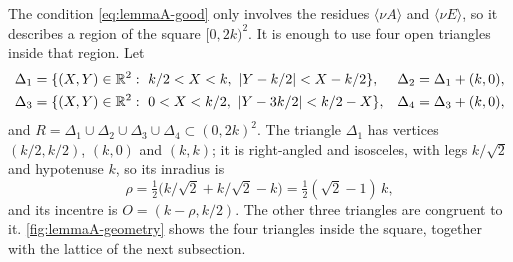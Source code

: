 The condition \eqref{eq:lemmaA-good} only involves the residues
$\langle \nu A\rangle$ and $\langle \nu E\rangle$, so it describes a region of the
square $[0,2k)^2$. It is enough to use four open triangles inside that region.
Let
\begin{align*}
\Delta_1&=\{(X,Y)\in\mathbb{R}^2:\ k/2<X<k,\ |Y-k/2|<X-k/2\}, & \Delta_2&=\Delta_1+(k,0),\\
\Delta_3&=\{(X,Y)\in\mathbb{R}^2:\ 0<X<k/2,\ |Y-3k/2|<k/2-X\}, & \Delta_4&=\Delta_3+(k,0),
\end{align*}
and $R=\Delta_1\cup \Delta_2\cup \Delta_3\cup \Delta_4\subset(0,2k)^2$. The triangle $\Delta_1$ has
vertices $(k/2,k/2)$, $(k,0)$ and $(k,k)$; it is right-angled and isosceles,
with legs $k/\sqrt2$ and hypotenuse $k$, so its inradius is
\begin{equation}
\rho=\tfrac12\bigl(k/\sqrt2+k/\sqrt2-k\bigr)=\tfrac12(\sqrt2-1)\,k,
\label{eq:lemmaA-rho}
\end{equation}
and its incentre is $O=(k-\rho,k/2)$. The other three triangles are
congruent to it. \autoref{fig:lemmaA-geometry} shows the four triangles
inside the square, together with the lattice of the next subsection.

